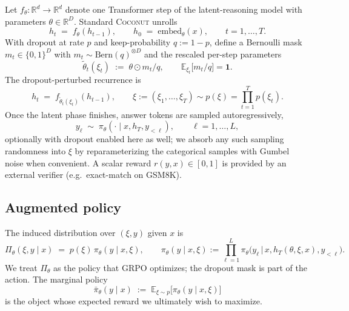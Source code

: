 \documentclass[11pt]{article}
\theoremstyle{definition}
\theoremstyle{remark}
\newcommand{\R}{\mathbb{R}}
\newcommand{\E}{\mathbb{E}}
\begin{document}
Let $f_\theta : \R^d \to \R^d$ denote one Transformer step of the
latent-reasoning model with parameters $\theta \in \R^D$.  Standard
\textsc{Coconut} unrolls
\begin{equation}
h_t \;=\; f_\theta(h_{t-1}),
\qquad
h_0 \;=\; \mathrm{embed}_\theta(x),
\qquad t = 1,\dots,T.
\end{equation}
With dropout at rate $p$ and keep-probability $q := 1-p$, define a Bernoulli
mask $m_t \in \{0,1\}^D$ with $m_t \sim \mathrm{Bern}(q)^{\otimes D}$ and the
rescaled per-step parameters
\begin{equation}
\tilde\theta_t(\xi_t) \;:=\; \theta \odot m_t / q,
\qquad
\E_{\xi_t}\!\big[m_t/q\big] = \mathbf 1.
\label{eq:dropout-rescale}
\end{equation}
The dropout-perturbed recurrence is
\begin{equation}
h_t \;=\; f_{\tilde\theta_t(\xi_t)}(h_{t-1}),
\qquad
\xi := (\xi_1, \dots, \xi_T) \sim p(\xi) = \prod_{t=1}^T p(\xi_t).
\label{eq:dropout-recurrence}
\end{equation}
Once the latent phase finishes, answer tokens are sampled autoregressively,
\begin{equation}
y_\ell \;\sim\; \pi_\theta(\cdot \mid x, h_T, y_{<\ell}),
\qquad \ell = 1, \dots, L,
\end{equation}
optionally with dropout enabled here as well; we absorb any such sampling
randomness into $\xi$ by reparameterizing the categorical samples with
Gumbel noise when convenient.  A scalar reward $r(y, x) \in [0,1]$ is provided
by an external verifier (e.g.\ exact-match on \textsc{GSM8K}).

\subsection{Augmented policy}
The induced distribution over $(\xi, y)$ given $x$ is
\begin{equation}
\Pi_\theta(\xi, y \mid x)
   \;=\; p(\xi) \, \pi_\theta(y \mid x, \xi),
\qquad
\pi_\theta(y \mid x, \xi)
  := \prod_{\ell=1}^{L} \pi_\theta\!\big(y_\ell \,\big|\, x, h_T(\theta,\xi,x), y_{<\ell}\big).
\label{eq:augmented-policy}
\end{equation}
We treat $\Pi_\theta$ as the policy that GRPO optimizes; the dropout mask is
part of the action.  The marginal policy
\begin{equation}
\bar\pi_\theta(y \mid x) \;:=\; \E_{\xi \sim p}\!\big[\pi_\theta(y \mid x, \xi)\big]
\label{eq:marginal-policy}
\end{equation}
is the object whose expected reward we ultimately wish to maximize.
\end{document}
